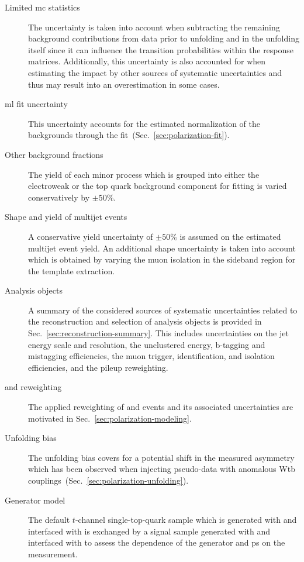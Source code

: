 \begin{description}
\item[Limited \gls{mc} statistics] The uncertainty is taken into account when subtracting the remaining background contributions from data prior to unfolding and in the unfolding itself since it can influence the transition probabilities within the response matrices. Additionally, this uncertainty is also accounted for when estimating the impact by other sources of systematic uncertainties and thus may result into an overestimation in some cases.

\item[\Gls{ml} fit uncertainty] This uncertainty accounts for the estimated normalization of the backgrounds through the fit~(Sec.~\ref{sec:polarization-fit}).

\item[Other background fractions] The yield of each minor process which is grouped into either the electroweak or the top quark background component for fitting is varied conservatively by $\pm50\%$.

\item[Shape and yield of multijet events] A conservative yield uncertainty of $\pm50\%$ is assumed on the estimated multijet event yield. An additional shape uncertainty is taken into account which is obtained by varying the muon isolation in the sideband region for the template extraction.

\item[Analysis objects] A summary of the considered sources of systematic uncertainties related to the reconstruction and selection of analysis objects is provided in Sec.~\ref{sec:reconstruction-summary}. This includes uncertainties on the jet energy scale and resolution, the unclustered energy, b-tagging and mistagging efficiencies, the muon trigger, identification, and isolation efficiencies, and the pileup reweighting.

\item[\wjets and \ttbar reweighting] The applied reweighting of \ttbar and \wjets events and its associated uncertainties are motivated in Sec.~\ref{sec:polarization-modeling}. 

\item[Unfolding bias] The unfolding bias covers for a potential shift in the measured asymmetry which has been observed when injecting pseudo-data with anomalous Wtb couplings~(Sec.~\ref{sec:polarization-unfolding}).

\item[Generator model] The default $t$-channel single-top-quark sample which is generated with \POWHEG and interfaced with  is exchanged by a signal sample generated with \AMC and interfaced with  to assess the dependence of the generator and \gls{ps} on the measurement.


\end{description}
